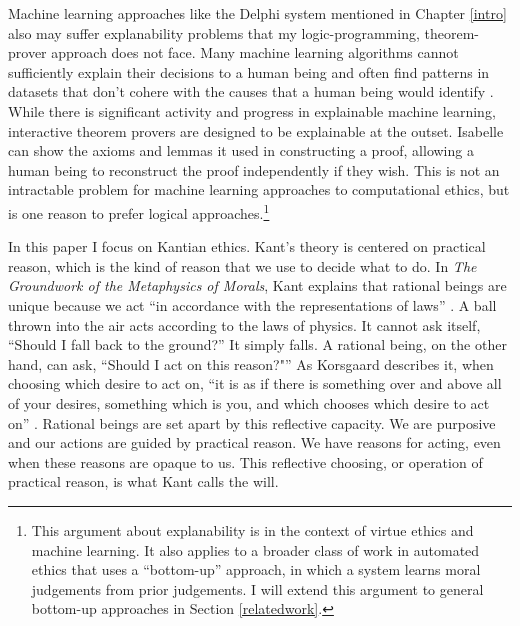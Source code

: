 \begin{isabellebody}
\begin{isamarkuptext}
Machine learning approaches like the Delphi system \citep{delphi} mentioned in Chapter \ref{intro} also may suffer explanability 
problems that my logic-programming, theorem-prover
approach does not face. Many machine learning algorithms cannot sufficiently explain their 
decisions to a human being and often find patterns in datasets that don't 
cohere with the causes that a human being would identify \citep{puiutta}. While there is significant activity 
and progress in explainable machine learning, interactive theorem provers are designed to be explainable 
at the outset. Isabelle can show the axioms and lemmas it used in constructing a proof, 
allowing a human being to reconstruct the proof independently if they wish. This is not an 
intractable problem for machine learning approaches to computational ethics, but is one reason to 
prefer logical approaches.\footnote{This argument about explanability is in the context of virtue ethics and 
machine learning. It also applies to a broader class of work in automated ethics 
that uses a ``bottom-up'' approach, in which a system learns moral judgements from prior judgements. 
I will extend this argument to general bottom-up approaches in Section \ref{relatedwork}.}%
\end{isamarkuptext}\isamarkuptrue%
%
\isadelimdocument
%
\endisadelimdocument
%
\isatagdocument
%
\isamarkuptrue%
%
\endisatagdocument
{\isafolddocument}%
%
\isadelimdocument
%
\endisadelimdocument
%
\begin{isamarkuptext}%
In this paper I focus on Kantian ethics. Kant's theory is centered 
on practical reason, which is the kind of reason that we 
use to decide what to do. In \emph{The Groundwork of the Metaphysics of Morals}, Kant explains that 
rational beings are unique because we act ``in accordance with 
the representations of laws'' \citep[4:412]{groundwork}. A ball thrown into the air acts 
according to the laws of physics. It cannot ask itself, ``Should I fall back to the ground?'' 
It simply falls. A rational being, on the other hand, can ask, ``Should I act on this reason?"''
As Korsgaard describes it, when choosing which desire to act on, ``it is as if there is something over 
and above all of your desires, something which is you, and which chooses which desire to act on'' \citep[100]{sources}. 
Rational beings are set apart by this reflective capacity. We are purposive and 
our actions are guided by practical reason. We have reasons for acting, even when these reasons are
opaque to us. This reflective choosing, or operation of practical reason, is what Kant calls the will. 


\end{isamarkuptext}
\end{isabellebody}
